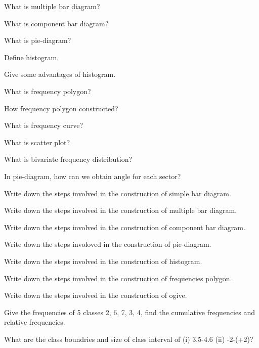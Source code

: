 \documentclass[11pt,a4paper]{article}
\begin{document}
\begin{shortlist}
\item What is multiple bar diagram?

\item What is component bar diagram?

\item What is pie-diagram?

\item Define histogram.

\item Give some advantages of histogram.

\item What is frequency polygon?

\item How frequency polygon constructed?

\item What is frequency curve?

\item What is scatter plot?

\item What is bivariate frequency distribution?

\item In pie-diagram, how can we obtain angle for each sector?

\item Write down the steps involved in the construction of simple bar diagram.

\item Write down the steps involved in the construction of multiple bar diagram.

\item Write down the steps involved in the construction of component bar diagram.

\item Write down the steps involoved in the construction of pie-diagram.

\item Write down the steps involved in the construction of histogram.

\item Write down the steps involved in the construction of frequencies polygon.

\item Write down the steps involved in the construction of ogive.

\item Give the frequencies of 5 classes 2, 6, 7, 3, 4, find the cumulative frequencies and relative frequencies.

\item What are the class boundries and size of class interval of (i) 3.5-4.6 (ii) -2-(+2)?


\end{shortlist}
\end{document}
